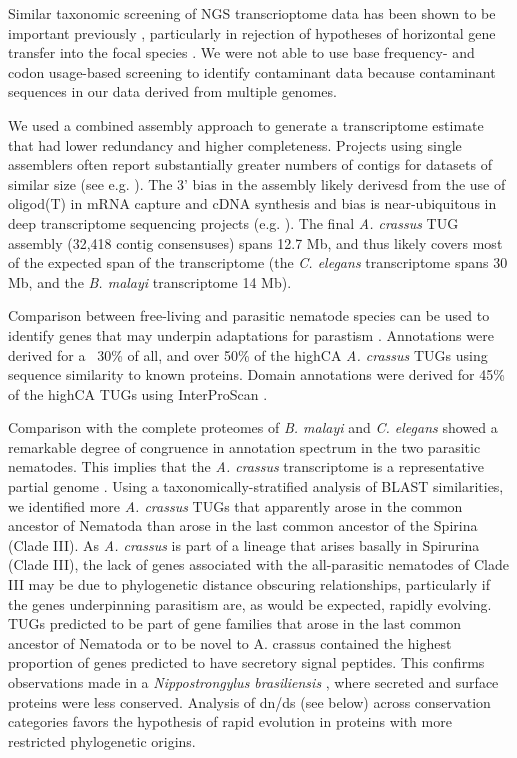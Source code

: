 \documentclass[10pt]{bmc_article}
\newenvironment{bmcformat}{\begin{raggedright}\baselineskip20pt\sloppy\setboolean{publ}{false}}{\end{raggedright}\baselineskip20pt\sloppy}
\begin{document}
\begin{bmcformat}
Similar taxonomic screening of NGS transcrioptome data has been shown
to be important previously \cite{pmid21138572}, particularly in
rejection of hypotheses of horizontal gene transfer into the focal
species \cite{pmid20386959}. We were not able to use base frequency-
and codon usage-based screening to identify contaminant data
\cite{pmid20034392, pmid17218127} because contaminant sequences in our
data derived from multiple genomes.


We used a combined assembly approach \cite{pmid20950480} to generate a
transcriptome estimate that had lower redundancy and higher
completeness. Projects using single assemblers often report
substantially greater numbers of contigs for datasets of similar size
(see e.g. \cite{pmid21364769}). The 3’ bias in the assembly likely
derivesd from the use of oligod(T) in mRNA capture and cDNA synthesis
and bias is near-ubiquitous in deep transcriptome sequencing projects
(e.g.  \cite{pmid20331785}). The final \textit{A. crassus} TUG
assembly (32,418 contig consensuses) spans 12.7 Mb, and thus likely
covers most of the expected span of the transcriptome (the
\textit{C. elegans} transcriptome spans 30 Mb, and the
\textit{B. malayi} transcriptome 14 Mb).

Comparison between free-living and parasitic nematode species can be
used to identify genes that may underpin adaptations for parastism
\cite{parkinson_transcriptomic_2004, wasmuth_extent_2008}. Annotations
were derived for a ~30\% of all, and over 50\% of the highCA
\textit{A. crassus} TUGs using sequence similarity to known
proteins. Domain annotations were derived for 45\% of the highCA TUGs
using InterProScan \cite{pmid11590104}.

Comparison with the complete proteomes of \textit{B. malayi} and
\textit{C. elegans} showed a remarkable degree of congruence in
annotation spectrum in the two parasitic nematodes. This implies that
the \textit{A. crassus} transcriptome is a representative partial
genome \cite{parkinson_partigene--constructing_2004}. Using a
taxonomically-stratified analysis of BLAST similarities, we identified
more \textit{A. crassus} TUGs that apparently arose in the common
ancestor of Nematoda than arose in the last common ancestor of the
Spirina (Clade III). As \textit{A. crassus} is part of a lineage that
arises basally in Spirurina (Clade III), the lack of genes associated
with the all-parasitic nematodes of Clade III may be due to
phylogenetic distance obscuring relationships, particularly if the
genes underpinning parasitism are, as would be expected, rapidly
evolving. TUGs predicted to be part of gene families that arose in the
last common ancestor of Nematoda or to be novel to A. crassus
contained the highest proportion of genes predicted to have secretory
signal peptides. This confirms observations made in a
\textit{Nippostrongylus brasiliensis} \cite{harcus_signal_2004}, where
secreted and surface proteins were less conserved. Analysis of dn/ds
(see below) across conservation categories favors the hypothesis of
rapid evolution in proteins with more restricted phylogenetic origins.


\end{bmcformat}
\end{document}
